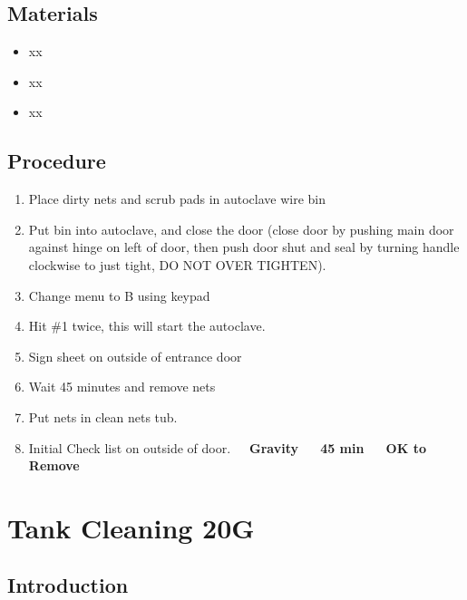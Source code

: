 \documentclass[
  letterpaper,
  DIV=11,
  numbers=noendperiod]{scrreprt}
\providecommand{\tightlist}{%
  \setlength{\itemsep}{0pt}\setlength{\parskip}{0pt}}\usepackage{longtable,booktabs,array}
\begin{document}
\hypertarget{materials-27}{%
\section{Materials}\label{materials-27}}

\begin{itemize}
\tightlist
\item
  xx
\item
  xx
\item
  xx
\end{itemize}

\hypertarget{procedure-26}{%
\section{Procedure}\label{procedure-26}}

\begin{enumerate}
\def\labelenumi{\arabic{enumi}.}
\tightlist
\item
  Place dirty nets and scrub pads in autoclave wire bin
\item
  Put bin into autoclave, and close the door (close door by pushing main
  door against hinge on left of door, then push door shut and seal by
  turning handle clockwise to just tight, DO NOT OVER TIGHTEN).
\item
  Change menu to B using keypad
\item
  Hit \#1 twice, this will start the autoclave.
\item
  Sign sheet on outside of entrance door
\item
  Wait 45 minutes and remove nets
\item
  Put nets in clean nets tub.
\item
  Initial Check list on outside of door.~~~\textbf{Gravity~~~45 min~~~OK
  to Remove}
\end{enumerate}

\hypertarget{sec-husbandry-20gal_tank_cleaning}{%
\chapter{Tank Cleaning 20G}\label{sec-husbandry-20gal_tank_cleaning}}

\hypertarget{introduction-28}{%
\section{Introduction}\label{introduction-28}}
\end{document}
